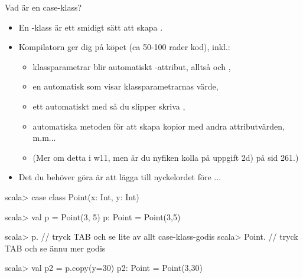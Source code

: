 \begin{Slide}{Vad är en case-klass?}\SlideFontSmall
\setlength{\leftmargini}{0pt}
\begin{itemize}
\item En -klass är ett smidigt sätt att skapa .
\item Kompilatorn ger dig  på köpet (ca 50-100 rader kod), inkl.:
\begin{itemize}\SlideFontTiny
\item klassparametrar blir automatiskt -attribut, alltså  och ,
\item en automatisk  som visar klassparametrarnas värde, 
\item ett automatiskt  med  så du slipper skriva ,
\item automatiska metoden  för att skapa kopior med andra attributvärden, m.m...
\item[] (Mer om detta i w11, men är du nyfiken kolla på uppgift 2d) på sid 261.)
\end{itemize}

\item Det  du behöver göra är att lägga till nyckelordet  före ...
\end{itemize}

\vspace{-0.5em}\begin{REPLnonum}
scala> case class Point(x: Int, y: Int)

scala> val p = Point(3, 5)
p: Point = Point(3,5)

scala> p.  // tryck TAB och se lite av allt case-klass-godis
scala> Point.  // tryck TAB och se ännu mer godis

scala> val p2 = p.copy(y=30)
p2: Point = Point(3,30)
\end{REPLnonum}


\end{Slide}


\fi




